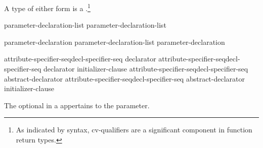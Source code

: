 \pnum
{}%
A type of either form is a .\footnote{As indicated by syntax, cv-qualifiers are a significant component in function return types.}

%
\begin{bnf}
\br
parameter-declaration-list\opt{} \opt\br
    parameter-declaration-list 
\end{bnf}

\begin{bnf}
\br
    parameter-declaration\br
    parameter-declaration-list \terminal{,} parameter-declaration
\end{bnf}

\begin{bnf}
\br
    attribute-specifier-seq\opt decl-specifier-seq declarator\br
    attribute-specifier-seq\opt decl-specifier-seq declarator \terminal{=} initializer-clause\br
    attribute-specifier-seq\opt decl-specifier-seq abstract-declarator\opt\br
    attribute-specifier-seq\opt decl-specifier-seq abstract-declarator\opt{} \terminal{=} initializer-clause
\end{bnf}

The optional  in a 
appertains to the parameter.

